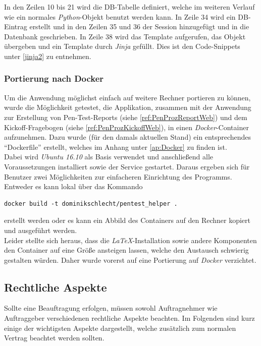 In den Zeilen 10 bis 21 wird die DB-Tabelle definiert, welche im weiteren Verlauf wie ein normales \textit{Python}-Objekt benutzt werden kann. In Zeile 34 wird ein DB-Eintrag erstellt und in den Zeilen 35 und 36 der Session hinzugefügt und in die Datenbank geschrieben. In Zeile 38 wird das Template aufgerufen, das Objekt übergeben und ein Template durch \textit{Jinja} gefüllt. Dies ist den Code-Snippets unter \ref{jinja2} zu entnehmen.

\subsubsection{Portierung nach Docker}\label{ref:PenProzPortDocker}
Um die Anwendung möglichst einfach auf weitere Rechner portieren zu können, wurde die Möglichkeit getestet, die Applikation, zusammen mit der Anwendung zur Erstellung von Pen-Test-Reports (siehe \ref{ref:PenProzReportWeb}) und dem Kickoff-Fragebogen (siehe \ref{ref:PenProzKickoffWeb}), in einen \textit{Docker}-Container aufzunehmen. Dazu wurde (für den damals aktuellen Stand) ein entsprechendes "`Dockerfile"' erstellt, welches im Anhang unter \ref{ap:Docker} zu finden ist.\\

Dabei wird \textit{Ubuntu 16.10} als Basis verwendet und anschließend alle Voraussetzungen installiert sowie der Service gestartet. Daraus ergeben sich für Benutzer zwei Möglichkeiten zur einfacheren Einrichtung des Programms. Entweder es kann lokal über das Kommando
\begin{lstlisting}
docker build -t dominikschlecht/pentest_helper .
\end{lstlisting}
erstellt werden oder es kann ein Abbild des Containers auf den Rechner kopiert und ausgeführt werden.\\

Leider stellte sich heraus, dass die \textit{LaTeX}-Installation sowie andere Komponenten den Container auf eine Größe ansteigen lassen, welche den Austausch schwierig gestalten würden. Daher wurde vorerst auf eine Portierung auf \textit{Docker} verzichtet.

	\subsection{Rechtliche Aspekte}
	Sollte eine Beauftragung erfolgen, müssen sowohl Auftragnehmer wie Auftraggeber  verschiedenen rechtliche Aspekte beachten. Im Folgenden sind kurz einige der wichtigsten Aspekte dargestellt, welche zusätzlich zum normalen Vertrag beachtet werden sollten.\\
	
